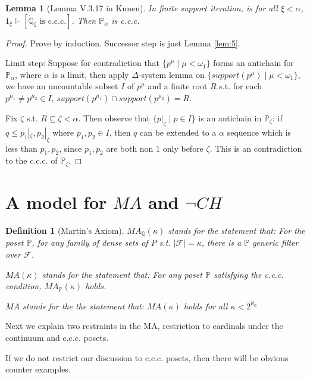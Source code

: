 \documentclass{article}
\newtheorem{definition}{Definition}
\newtheorem{lemma}{Lemma}
\newcommand{\bbP}{\mathbb{P}}
\newcommand{\bbQ}{\mathbb{Q}}
\begin{document}
\begin{lemma}[Lemma V.3.17 in Kunen]\label{lem:6}
    In finite support iteration, is for all $\xi<\alpha$, $1_\xi\Vdash [\dot{\bbQ}_\xi \text{ is c.c.c.}]$. Then $\bbP_\alpha$ is c.c.c.
\end{lemma}

\begin{proof}
    Prove by induction. Successor step is just Lemma \ref{lem:5}. 

    Limit step: Suppose for contradiction that $\{p^\mu\mid \mu<\omega_1\}$ forms an antichain for $\bbP_\alpha$, where $\alpha$ is a limit, then apply $\Delta$-system lemma on $\{support(p^\mu)\mid \mu<\omega_1\}$, we have an uncountable subset $I$ of $p^\mu$ and a finite root $R$ s.t. for each $p^{\mu_1}\neq p^{\mu_2}\in I$, $support(p^{\mu_1})\cap support(p^{\mu_2}) = R$. 

    Fix $\zeta$ s.t. $R\subseteq \zeta<\alpha$. Then observe that $\{p|_\zeta\mid p\in I\}$ is an antichain in $\mathbb{P}_\zeta$: if $q\leq p_1|_\zeta,p_2|_\zeta$ where $p_1,p_2\in I$, then $q$ can be extended to a $\alpha$ sequence which is less than $p_1,p_2$, since $p_1,p_2$ are both non $1$ only before $\zeta$. This is an contradiction to the c.c.c. of $\mathbb{P}_\zeta$.
\end{proof}

\section{A model for $MA$ and $\neg CH$}

\begin{definition}[Martin's Axiom]
    $MA_\bbQ(\kappa)$ stands for the statement that: For the poset $\bbP$, for any family of dense sets of $P$ s.t. $|\mathcal{F}| = \kappa$, there is a $\bbP$ generic filter over $\mathcal{F}$.

    $MA(\kappa)$ stands for the statement that: For any poset $\bbP$  satisfying the c.c.c. condition, $MA_\bbP(\kappa)$ holds.

    $MA$ stands for the the statement that: $MA(\kappa)$ holds for all $\kappa< 2^{\aleph_0}$
\end{definition}



Next we explain two restraints in the MA, restriction to cardinals under the continuum and c.c.c. posets.

If we do not restrict our discussion to c.c.c. posets, then there will be obvious counter examples. 
\end{document}
